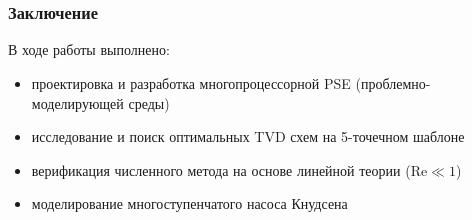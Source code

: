 \documentclass[ucs]{beamer}
\begin{document}
\section*{}
\begin{frame}
	\frametitle{Заключение}
	В ходе работы выполнено:
	\begin{itemize}
		\item проектировка и разработка многопроцессорной \alert{PSE} (проблемно-моделирующей среды) \\
		\item исследование и поиск оптимальных \alert{TVD схем} на 5-точечном шаблоне \\
		\item \alert{верификация} численного метода на основе линейной теории (\(\mathrm{Re}\ll1\)) \\
		\item моделирование многоступенчатого \alert{насоса Кнудсена} \\
	\end{itemize}
\end{frame}
\end{document}
